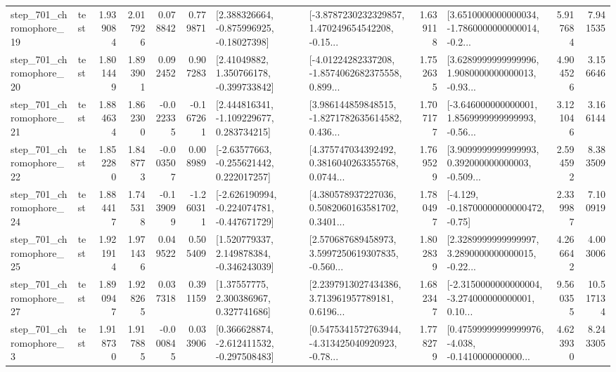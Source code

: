 \begin{tabular}{llrrrrllrlrr}
  step\_701\_chromophore\_19 &      test &      1.939084 &    2.017926 &      0.078842 &  0.779871 &    [2.388326664, -0.875996925, -0.18027398] &  [-3.8787230232329857, 1.470249654542208, -0.15... &       1.639118 &  [3.6510000000000034, -1.7860000000000014, -0.2... &            5.917684 &          7.941535 \\
  step\_701\_chromophore\_20 &      test &      1.801449 &    1.893901 &      0.092452 &  0.907283 &     [2.41049882, 1.350766178, -0.399733842] &  [-4.01224282337208, -1.8574062682375558, 0.899... &       1.752635 &  [3.6289999999999996, 1.9080000000000013, -0.93... &            4.904526 &          3.156646 \\
  step\_701\_chromophore\_21 &      test &      1.884634 &    1.862300 &     -0.022335 & -0.167261 &    [2.444816341, -1.109229677, 0.283734215] &  [3.986144859848515, -1.8271782635614582, 0.436... &       1.707177 &  [-3.646000000000001, 1.8569999999999993, -0.56... &            3.121046 &          3.166144 \\
  step\_701\_chromophore\_22 &      test &      1.852280 &    1.848773 &     -0.003507 &  0.008989 &    [-2.63577663, -0.255621442, 0.222017257] &  [4.375747034392492, 0.3816040263355768, 0.0744... &       1.769529 &  [3.9099999999999993, 0.392000000000003, -0.509... &            2.594592 &          8.383509 \\
  step\_701\_chromophore\_24 &      test &      1.884417 &    1.745318 &     -0.139099 & -1.260311 &  [-2.626190994, -0.224074781, -0.447671729] &  [4.380578937227036, 0.5082060163581702, 0.3401... &       1.780497 &              [-4.129, -0.18700000000000472, -0.75] &            2.339987 &          7.100919 \\
  step\_701\_chromophore\_25 &      test &      1.921914 &    1.971436 &      0.049522 &  0.505409 &    [1.520779337, 2.149878384, -0.346243039] &  [2.570687689458973, 3.5997250619307835, -0.560... &       1.802839 &  [2.3289999999999997, 3.2890000000000015, -0.22... &            4.266642 &          4.003006 \\
  step\_701\_chromophore\_27 &      test &      1.890947 &    1.928265 &      0.037318 &  0.391159 &      [1.37557775, 2.300386967, 0.327741686] &  [2.2397913027434386, 3.713961957789181, 0.6196... &       1.682347 &  [-2.3150000000000004, -3.274000000000001, 0.10... &            9.560355 &         10.517134 \\
   step\_701\_chromophore\_3 &      test &      1.918730 &    1.917885 &     -0.000845 &  0.033906 &   [0.366628874, -2.612411532, -0.297508483] &  [0.5475341572763944, -4.313425040920923, -0.78... &       1.778279 &  [0.47599999999999976, -4.038, -0.1410000000000... &            4.623930 &          8.243305 \\

\end{tabular}
